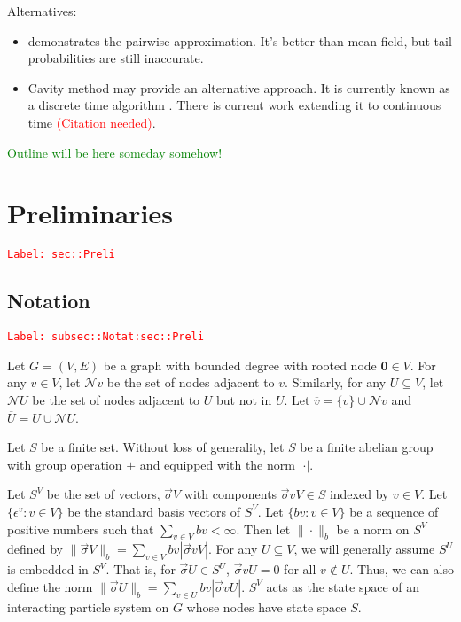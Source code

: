 \documentclass[12pt]{article}
\newcommand{\mc}{\mathcal}
\newcommand{\ov}{\overline}
\newcommand{\ep}{\epsilon}
\newcommand{\tr}{\textcolor{red}}
\newcommand{\tg}{\textcolor{green}}
\newcommand{\labe}[1]{\tr{\texttt{Label: #1}}}
\newcommand{\ind}{\hspace{24pt}}
\renewcommand{\root}{\mathbf{0}}				%
\renewcommand{\v}{v}							%
\renewcommand{\U}{U}							%
\renewcommand{\S}{S}							%
\newcommand{\s}{\sigma}							%
\newcommand{\sv}{\vec{\s}}						%
\renewcommand{\b}{b}							%
\newcommand{\ev}[1]{\ep^{#1}}					%
\newcommand{\neigh}{\mc{N}}						%
\newcommand{\cl}{\ov}							%
\newcommand{\XState}[1]{\S^{#1}}				%
\begin{document}
Alternatives:

\begin{itemize}
\item \cite{Gas15} demonstrates the pairwise approximation. It's better than mean-field, but tail probabilities are still inaccurate.

\item Cavity method may provide an alternative approach. It is currently known as a discrete time algorithm \cite{Lac15}\cite{KanMon11}. There is current work extending it to continuous time \tr{(Citation needed)}.
\end{itemize}

\tg{Outline will be here someday somehow!}


\section{Preliminaries}
\label{sec::Preli}\labe{sec::Preli}

\subsection{Notation}
\label{subsec::Notat:sec::Preli}\labe{subsec::Notat:sec::Preli}

Let \(G = ( V,E)\) be a graph with bounded degree with rooted node \(\root \in  V\). For any \(\v \in  V\), let \(\neigh{\v}\) be the set of nodes adjacent to \(\v\). Similarly, for any \(\U \subseteq  V\), let \(\neigh{\U}\) be the set of nodes adjacent to \(\U\) but not in \(\U\). Let \(\cl{\v} = \{\v\}\cup\neigh{\v}\) and \(\cl{\U} = \U\cup \neigh{\U}\). 

\ind Let \(\S\) be a finite set. Without loss of generality, let \(S\) be a finite abelian group with group operation \(+\) and equipped with the norm \(|\cdot|\). 

\ind Let \(\S^ V\) be the set of vectors, \(\sv{}{ V}\) with components \(\sv{\v}{ V} \in \S\) indexed by \(\v\in  V\). Let \(\{\ev{\v}: \v\in  V\}\) be the standard basis vectors of \(\S^ V\). Let \(\{\b{\v}:\v\in  V\}\) be a sequence of positive numbers such that \(\sum_{\v\in V} \b{\v} < \infty\). Then let \(\|\cdot\|_{\b{}}\) be a norm on \(\S^ V\) defined by \(\|\sv{}{ V}\|_{\b{}} = \sum_{\v\in V} \b{\v}|\sv{\v}{ V}|\). For any \(\U\subseteq  V\), we will generally assume \(\S^\U\) is embedded in \(\S^ V\). That is, for \(\sv{}{\U}\in \S^\U\), \(\sv{\v}{\U} = 0\) for all \(\v\notin\U\). Thus, we can also define the norm \(\|\sv{}{\U}\|_{\b{}} = \sum_{\v\in\U} \b{\v}|\sv{\v}{\U}|\). \(\S^ V\) acts as the state space of an interacting particle system on \(G\) whose nodes have state space \(\S\).
\end{document}
